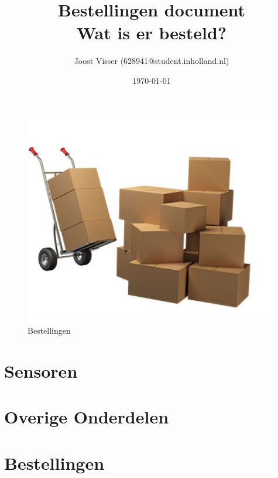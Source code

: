 \documentclass{article}
\title{\LARGE{Bestellingen document}\\\normalsize{Wat is er besteld?}}
\author{Joost Visser (628941@student.inholland.nl)}
\date{\today}
\newcommand{\contents} {
  {
    \hypersetup{hidelinks}
    \tableofcontents
  }
  \clearpage
}
\begin{document}
    \maketitle
    \vspace{8em}
    \begin{figure}[H]
        \centering
        \includegraphics[width=30em]{fotos/cover.jpg}
        \caption[]{Bestellingen}
    \end{figure}
    \vfill
    \newpage

    \contents
    

    \begin{flushleft}

    \section{Sensoren}
    \label{sec:Sensoren}
    
     
    \section{Overige Onderdelen}
    \label{sec:overige_onderdelen}
    

     \section{Bestellingen}
     \label{sec:Bestellingen}
     
    \end{flushleft}
\end{document}
